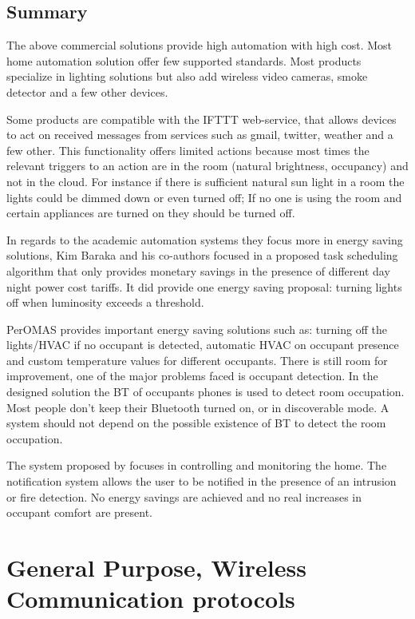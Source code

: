 \subsection{Summary}

The above commercial solutions provide high automation with high cost. Most home automation solution offer few supported standards. Most products specialize in lighting solutions but also add wireless video cameras, smoke detector and a few other devices. 

Some products are compatible with the IFTTT web-service, that allows devices to act on received messages from services such as gmail, twitter, weather and a few other. This functionality offers limited actions because most times the relevant triggers to an action are in the room (natural brightness, occupancy) and not in the cloud. For instance if there is sufficient natural sun light in a room the lights could be dimmed down or even turned off; If no one is using the room and certain appliances are turned on they should be turned off. 

In regards to the academic automation systems they focus more in energy saving  solutions, Kim Baraka and his co-authors\cite{academic:arduino1} focused in a proposed task scheduling algorithm that only provides monetary savings in the presence of different day night power cost tariffs. It did provide one energy saving proposal: turning lights off when luminosity exceeds a threshold.

PerOMAS\cite{peromas} provides important energy saving solutions such as: turning off the lights/\ac{HVAC} if no occupant is detected, automatic HVAC on occupant presence and custom temperature values for different occupants. There is still room for improvement, one of the major problems faced is occupant detection. In the designed solution the \ac{BT} of occupants phones is used to detect room occupation. Most people don't keep their Bluetooth turned on, or in discoverable mode. A system should not depend on the possible existence of \ac{BT} to detect the room occupation. 

The system proposed by \cite{academic3} focuses in controlling and monitoring the home. The notification system allows the user to be notified in the presence of an intrusion or fire detection.
No energy savings are achieved and no real increases in occupant comfort are present.



\section{General Purpose, Wireless Communication protocols} \label{ssec:num2}

